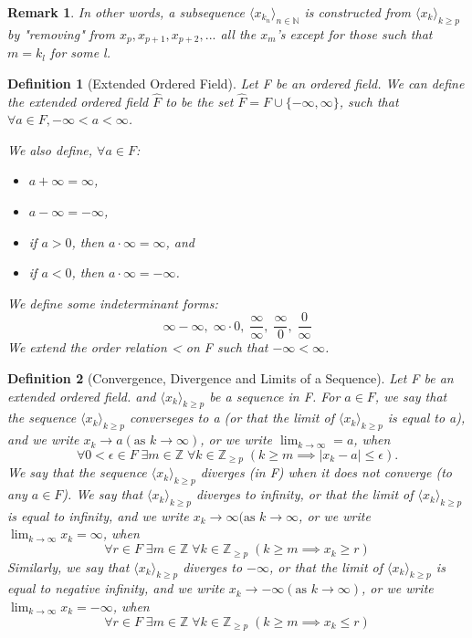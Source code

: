 \documentclass[11pt, oneside]{book}
\theoremstyle{break}
\newtheorem*{remark}{Remark}
\newtheorem{defn}{Definition}[section]
\newcommand{\bb}[1]{\mathbb{#1}}		%
\begin{document}
\begin{remark}
	In other words, a subsequence $\langle x_{k_n} \rangle_{n \in \bb{N}}$ is constructed from $\langle x_k \rangle_{k \geq p}$ by "removing" from $x_p, x_{p + 1}, x_{p + 2}, ...$ all the $x_m$'s except for those such that $m = k_l$ for some l.
\end{remark}

\begin{defn}[Extended Ordered Field]
	Let F be an ordered field. We can define the extended ordered field $\hat{F}$ to be the set $\hat{F} = F \cup \{-\infty, \infty\}$, such that $\forall a \in F, -\infty < a < \infty$.

	We also define, $\forall a \in F$:
	\begin{itemize}
		\item $a + \infty = \infty$,
		\item $a - \infty = -\infty$,
		\item if $a > 0$, then $a \cdot \infty = \infty$, and
		\item if $a < 0$, then $a \cdot \infty = -\infty$.
	\end{itemize}

	We define some indeterminant forms:
	\[
		\infty - \infty, \; \infty \cdot 0, \; \frac{\infty}{\infty}, \; \frac{\infty}{0}, \; \frac{0}{\infty}
	\]
	We extend the order relation < on F such that $-\infty < \infty$.
\end{defn}

\begin{defn}[Convergence, Divergence and Limits of a Sequence]
	Let F be an extended ordered field. and $\langle x_k \rangle_{k \geq p}$ be a sequence in F. For $a \in F$, we say that the sequence $\langle x_k \rangle_{k \geq p}$ converseges to a (or that the limit of $\langle x_k \rangle_{k \geq p}$ is equal to a), and we write $x_k \to a (\text{as } k \to \infty)$, or we write $\lim_{k \to \infty} = a$, when
	\[
		\forall 0 < \epsilon \in F \; \exists m \in \bb{Z} \; \forall k \in \bb{Z}_{\geq p} \; (k \geq m \implies |x_k - a| \leq \epsilon).
	\]
	We say that the sequence $\langle x_k \rangle_{k \geq p}$ diverges (in F) when it does not converge (to any $a \in F$). We say that $\langle x_k \rangle_{k \geq p}$ diverges to infinity, or that the limit of $\langle x_k \rangle_{k \geq p}$ is equal to infinity, and we write $x_k \to \infty (\text{as } k \to \infty$, or we write $\lim_{k \to \infty}x_k = \infty$, when
	\[
		\forall r \in F \; \exists m \in \bb{Z} \; \forall k \in \bb{Z}_{\geq p} \; (k \geq m \implies x_k \geq r)
	\]
	Similarly, we say that $\langle x_k \rangle_{k \geq p}$ diverges to $-\infty$, or that the limit of $\langle x_k \rangle_{k \geq p}$ is equal to negative infinity, and we write $x_k \to -\infty (\text{as } k \to \infty)$, or we write $\lim_{k \to \infty}x_k = -\infty$, when
	\[
		\forall r \in F \; \exists m \in \bb{Z} \; \forall k \in \bb{Z}_{\geq p} \; (k \geq m \implies x_k \leq r)
	\]
\end{defn}
\end{document}
